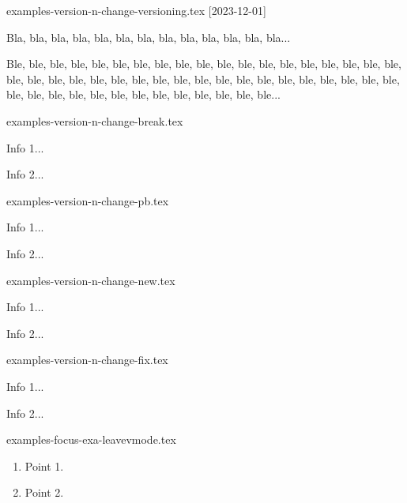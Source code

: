 \begin{filecontents*}[overwrite]{examples-version-n-change-versioning.tex}
[2023-12-01]

Bla, bla, bla, bla, bla, bla, bla, bla, bla, bla, bla, bla, bla...

\bigskip %


Ble, ble, ble, ble, ble, ble, ble, ble, ble, ble, ble, ble, ble,
ble, ble, ble, ble, ble, ble, ble, ble, ble, ble, ble, ble, ble,
ble, ble, ble, ble, ble, ble, ble, ble, ble, ble, ble, ble, ble,
ble, ble, ble, ble, ble, ble, ble, ble, ble, ble, ble, ble...
\end{filecontents*}


\begin{filecontents*}[overwrite]{examples-version-n-change-break.tex}
\begin{tdocbreak}
    \item Info 1...
    \item Info 2...
\end{tdocbreak}
\end{filecontents*}


\begin{filecontents*}[overwrite]{examples-version-n-change-pb.tex}
\begin{tdocprob}
    \item Info 1...
    \item Info 2...
\end{tdocprob}
\end{filecontents*}


\begin{filecontents*}[overwrite]{examples-version-n-change-new.tex}
\begin{tdocnew}
    \item Info 1...
    \item Info 2...
\end{tdocnew}
\end{filecontents*}


\begin{filecontents*}[overwrite]{examples-version-n-change-fix.tex}
\begin{tdocfix}
    \item Info 1...
    \item Info 2...
\end{tdocfix}
\end{filecontents*}


\begin{filecontents*}[overwrite]{examples-focus-exa-leavevmode.tex}
\begin{tdocexa}
    \leavevmode

    \begin{enumerate}
        \item Point 1.

        \item Point 2.
    \end{enumerate}
\end{tdocexa}
\end{filecontents*}


